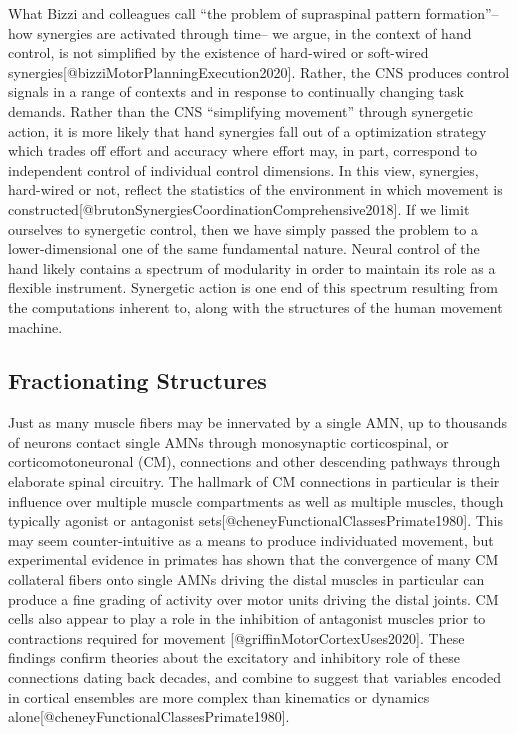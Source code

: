 \documentclass[../main.tex]{subfiles}
\begin{document}
{{{What Bizzi and colleagues call ``the problem of supraspinal pattern
formation''--how synergies are activated through time-- we argue, in the
context of hand control, is not simplified by the existence of
hard-wired or soft-wired
synergies{[}@bizziMotorPlanningExecution2020{]}. Rather, the CNS
produces control signals in a range of contexts and in response to
continually changing task demands. Rather than the CNS ``simplifying
movement'' through synergetic action, it is more likely that hand
synergies fall out of a optimization strategy which trades off effort
and accuracy where effort may, in part, correspond to independent
control of individual control dimensions. In this view, synergies,
hard-wired or not, reflect the statistics of the environment in which
movement is
constructed{[}@brutonSynergiesCoordinationComprehensive2018{]}. If we
limit ourselves to synergetic control, then we have simply passed the
problem to a lower-dimensional one of the same fundamental nature.
Neural control of the hand likely contains a spectrum of modularity in
order to maintain its role as a flexible instrument. Synergetic action
is one end of this spectrum resulting from the computations inherent to,
along with the structures of the human movement machine.

\subsection{Fractionating Structures}\label{fractionating-structures}

Just as many muscle fibers may be innervated by a single AMN, up to
thousands of neurons contact single AMNs through monosynaptic
corticospinal, or corticomotoneuronal (CM), connections and other
descending pathways through elaborate spinal circuitry. The hallmark of
CM connections in particular is their influence over multiple muscle
compartments as well as multiple muscles, though typically agonist or
antagonist sets{[}@cheneyFunctionalClassesPrimate1980{]}. This may seem
counter-intuitive as a means to produce individuated movement, but
experimental evidence in primates has shown that the convergence of many
CM collateral fibers onto single AMNs driving the distal muscles in
particular can produce a fine grading of activity over motor units
driving the distal joints. CM cells also appear to play a role in the
inhibition of antagonist muscles prior to contractions required for
movement {[}@griffinMotorCortexUses2020{]}. These findings confirm
theories about the excitatory and inhibitory role of these connections
dating back decades, and combine to suggest that variables encoded in
cortical ensembles are more complex than kinematics or dynamics
alone{[}@cheneyFunctionalClassesPrimate1980{]}.

}}}
\end{document}

